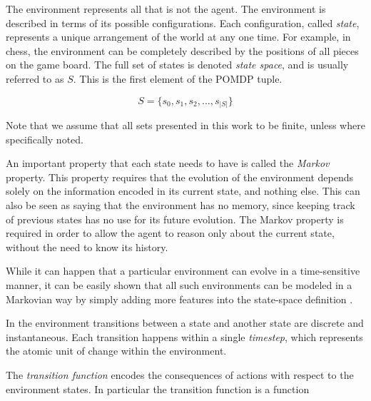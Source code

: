 

The environment represents all that is not the agent. The environment is described in terms of its
possible configurations.  Each configuration, called \textit{state}, represents a unique
arrangement of the world at any one time. For example, in chess, the environment can be completely
described by the positions of all pieces on the game board.  The full set of states is denoted
\textit{state space}, and is usually referred to as $S$. This is the first element of the POMDP
tuple.

\[ S = \{s_0, s_1, s_2, ..., s_{|S|}\} \]

Note that we assume that all sets presented in this work to be finite, unless where specifically
noted. 

An important property that each state needs to have is called the \textit{Markov} property. This
property requires that the evolution of the environment depends solely on the information encoded in
its current state, and nothing else. This can also be seen as saying that the environment has no
memory, since keeping track of previous states has no use for its future evolution. The Markov
property is required in order to allow the agent to reason only about the current state, without the
need to know its history.

While it can happen that a particular environment can evolve in a time-sensitive manner, it can be
easily shown that all such environments can be modeled in a Markovian way by simply adding more
features into the state-space definition \cite{cit:boutilier}.

In the environment transitions between a state and another state are discrete and instantaneous.
Each transition happens within a single \textit{timestep}, which represents the atomic unit of
change within the environment.


The \textit{transition function} encodes the consequences of actions with respect to the environment
states. In particular the transition function is a function

